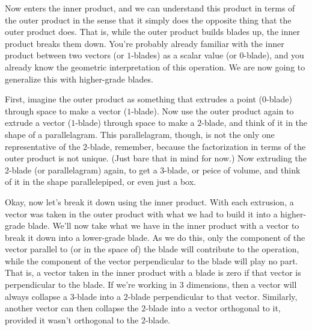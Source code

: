 \documentclass[12pt]{article}
\begin{document}
Now enters the inner product, and we can understand this product in terms of the
outer product in the sense that it simply does the opposite thing that the outer product
does.  That is, while the outer product builds blades up, the inner product breaks them
down.  You're probably already familiar with the inner product between two vectors (or $1$-blades)
as a scalar value (or $0$-blade), and you already know the geometric interpretation of
this operation.  We are now going to generalize this with higher-grade blades.

First, imagine the outer product as something that extrudes a point ($0$-blade) through
space to make a vector ($1$-blade).  Now use the outer product again to extrude a vector
($1$-blade) through space to make a $2$-blade, and think of it in the shape of a parallelagram.
This parallelagram, though, is not the only one representative of the $2$-blade, remember,
because the factorization in terms of the outer product is not unique.  (Just bare that in mind for now.)
Now extruding the $2$-blade (or parallelagram) again, to get a $3$-blade, or peice of volume,
and think of it in the shape parallelepiped, or even just a box.

Okay, now let's break it down using the inner product.  With each extrusion, a vector was
taken in the outer product with what we had to build it into a higher-grade blade.  We'll now
take what we have in the inner product with a vector to break it down into a lower-grade blade.
As we do this, only the component of the vector parallel to (or in the space of) the blade
will contribute to the operation, while the component of the vector perpendicular to the blade
will play no part.  That is, a vector taken in the inner product with a blade is zero if that vector
is perpendicular to the blade.  If we're working in 3 dimensions, then a vector will always collapse
a $3$-blade into a $2$-blade perpendicular to that vector.  Similarly, another vector can then
collapse the $2$-blade into a vector orthogonal to it, provided it wasn't orthogonal to the $2$-blade.
\end{document}
